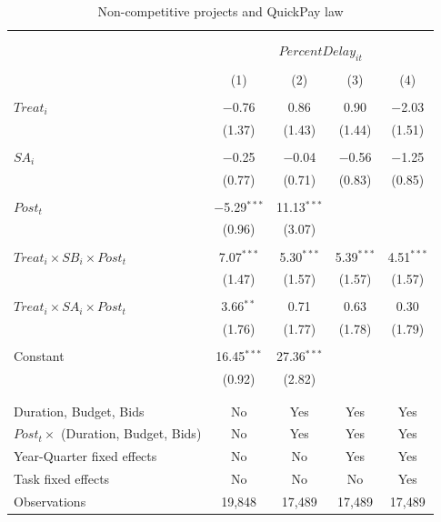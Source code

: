 \documentclass[
]{article}
\begin{document}
\begin{table}[H] \centering 
  \caption{Non-competitive projects and QuickPay law} 
  \label{} 
\small 
\begin{tabular}{@{\extracolsep{-2pt}}lcccc} 
\\[-1.8ex]\hline 
\hline \\[-1.8ex] 
\\[-1.8ex] & \multicolumn{4}{c}{$PercentDelay_{it}$  } \\ 
\\[-1.8ex] & (1) & (2) & (3) & (4)\\ 
\hline \\[-1.8ex] 
 $Treat_i$ & $-$0.76 & 0.86 & 0.90 & $-$2.03 \\ 
  & (1.37) & (1.43) & (1.44) & (1.51) \\ 
  & & & & \\ 
 $SA_i$ & $-$0.25 & $-$0.04 & $-$0.56 & $-$1.25 \\ 
  & (0.77) & (0.71) & (0.83) & (0.85) \\ 
  & & & & \\ 
 $Post_t$ & $-$5.29$^{***}$ & 11.13$^{***}$ &  &  \\ 
  & (0.96) & (3.07) &  &  \\ 
  & & & & \\ 
 $Treat_i \times SB_i \times Post_t$ & 7.07$^{***}$ & 5.30$^{***}$ & 5.39$^{***}$ & 4.51$^{***}$ \\ 
  & (1.47) & (1.57) & (1.57) & (1.57) \\ 
  & & & & \\ 
 $Treat_i \times SA_i \times Post_t$ & 3.66$^{**}$ & 0.71 & 0.63 & 0.30 \\ 
  & (1.76) & (1.77) & (1.78) & (1.79) \\ 
  & & & & \\ 
 Constant & 16.45$^{***}$ & 27.36$^{***}$ &  &  \\ 
  & (0.92) & (2.82) &  &  \\ 
  & & & & \\ 
\hline \\[-1.8ex] 
Duration, Budget, Bids & No & Yes & Yes & Yes \\ 
$Post_t \times $  (Duration, Budget, Bids) & No & Yes & Yes & Yes \\ 
Year-Quarter fixed effects & No & No & Yes & Yes \\ 
Task fixed effects & No & No & No & Yes \\ 
Observations & 19,848 & 17,489 & 17,489 & 17,489 \\ 

\end{tabular}
\end{table}
\end{document}
